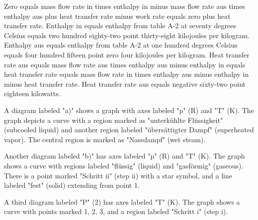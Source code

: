 Zero equals mass flow rate in times enthalpy in minus mass flow rate aus times enthalpy aus plus heat transfer rate minus work rate equals zero plus heat transfer rate.  
Enthalpy in equals enthalpy from table A-2 at seventy degrees Celsius equals two hundred eighty-two point thirty-eight kilojoules per kilogram.  
Enthalpy aus equals enthalpy from table A-2 at one hundred degrees Celsius equals four hundred fifteen point zero four kilojoules per kilogram.  
Heat transfer rate aus equals mass flow rate aus times enthalpy aus minus enthalpy in equals heat transfer rate equals mass flow rate in times enthalpy aus minus enthalpy in minus heat transfer rate.  
Heat transfer rate aus equals negative sixty-two point eighteen kilowatts.

A diagram labeled "a)" shows a graph with axes labeled "p" (R) and "T" (K). The graph depicts a curve with a region marked as "unterkühlte Flüssigkeit" (subcooled liquid) and another region labeled "übersättigter Dampf" (superheated vapor). The central region is marked as "Nassdampf" (wet steam).

Another diagram labeled "b)" has axes labeled "p" (R) and "T" (K). The graph shows a curve with regions labeled "flüssig" (liquid) and "gasförmig" (gaseous). There is a point marked "Schritt ii" (step ii) with a star symbol, and a line labeled "fest" (solid) extending from point 1.

A third diagram labeled "P" (2) has axes labeled "T" (K). The graph shows a curve with points marked 1, 2, 3, and a region labeled "Schritt i" (step i).
